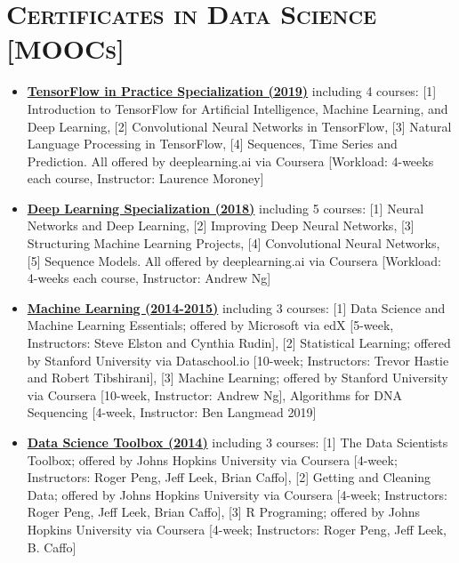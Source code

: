 \documentclass[10pt,a4paper]{moderncv}
\begin{document}
\section{\textsc{Certificates in Data Science [MOOCs]}}

\begin{itemize}
\item \textbf{\href{https://www.coursera.org/specializations/tensorflow-in-practice}{TensorFlow in Practice Specialization (2019)} }including 4 courses: [1] Introduction to TensorFlow for Artificial Intelligence, Machine Learning, and Deep Learning, [2] Convolutional Neural Networks in TensorFlow, [3] Natural Language Processing in TensorFlow, [4] Sequences, Time Series and Prediction. All offered by deeplearning.ai via Coursera [Workload: 4-weeks each course, Instructor: Laurence Moroney]
\vspace{.2cm}

\item \textbf{\href{https://www.coursera.org/specializations/deep-learning}{Deep Learning Specialization (2018)}} including 5 courses: [1] Neural Networks and Deep Learning, [2] Improving Deep Neural Networks, [3] Structuring Machine Learning Projects, [4] Convolutional Neural Networks, [5] Sequence Models. All offered by deeplearning.ai via Coursera [Workload: 4-weeks each course, Instructor: Andrew Ng]
\vspace{.2cm}

\item \textbf{\href{}{Machine Learning (2014-2015)}} including 3 courses: [1] Data Science and Machine Learning Essentials; offered by Microsoft via edX [5-week, Instructors: Steve Elston and Cynthia Rudin], [2] Statistical Learning; offered by Stanford University via Dataschool.io [10-week; Instructors: Trevor Hastie and Robert Tibshirani], [3] Machine Learning; offered by Stanford University via Coursera [10-week, Instructor: Andrew Ng], Algorithms for DNA Sequencing [4-week, Instructor: Ben Langmead 2019]
\vspace{.2cm}

\item \textbf{\href{}{Data Science Toolbox (2014)}} including 3 courses: [1] The Data Scientists Toolbox; offered by Johns Hopkins University via Coursera [4-week; Instructors: Roger Peng, Jeff Leek, Brian Caffo], [2] Getting and Cleaning Data; offered by Johns Hopkins University via Coursera [4-week; Instructors: Roger Peng, Jeff Leek, Brian Caffo], [3] R Programing; offered by Johns Hopkins University via Coursera [4-week; Instructors: Roger Peng, Jeff Leek, B. Caffo]

\end{itemize} 
\end{document}

